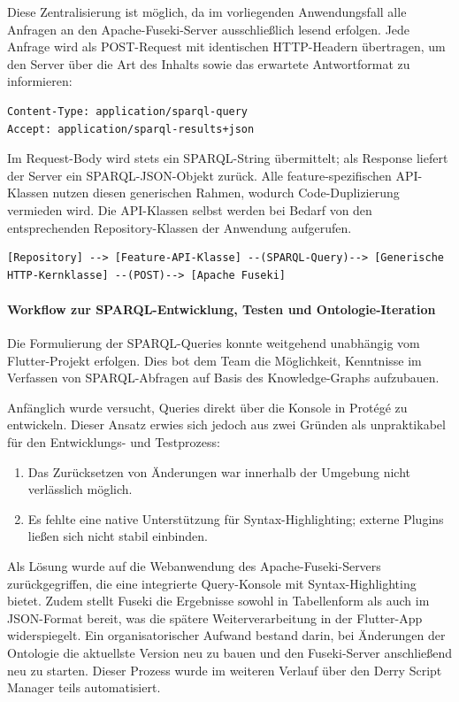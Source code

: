 Diese Zentralisierung ist möglich, da im vorliegenden Anwendungsfall alle Anfragen an den Apache-Fuseki-Server ausschließlich lesend erfolgen. Jede Anfrage wird als POST-Request mit identischen HTTP-Headern übertragen, um den Server über die Art des Inhalts sowie das erwartete Antwortformat zu informieren:

\begin{lstlisting}[caption={HTTP-Header der SPARQL-Anfragen}, label={lst:http_header}]
Content-Type: application/sparql-query
Accept: application/sparql-results+json
\end{lstlisting}

Im Request-Body wird stets ein SPARQL-String übermittelt; als Response liefert der Server ein SPARQL-JSON-Objekt zurück. Alle feature-spezifischen API-Klassen nutzen diesen generischen Rahmen, wodurch Code-Duplizierung vermieden wird. Die API-Klassen selbst werden bei Bedarf von den entsprechenden Repository-Klassen der Anwendung aufgerufen.

\begin{lstlisting}[caption={Aufrufkette einer SPARQL-Anfrage}, label={lst:aufrufkette}]
[Repository] --> [Feature-API-Klasse] --(SPARQL-Query)--> [Generische HTTP-Kernklasse] --(POST)--> [Apache Fuseki]
\end{lstlisting}

\paragraph{Workflow zur SPARQL-Entwicklung, Testen und Ontologie-Iteration}

Die Formulierung der SPARQL-Queries konnte weitgehend unabhängig vom Flutter-Projekt erfolgen. Dies bot dem Team die Möglichkeit, Kenntnisse im Verfassen von SPARQL-Abfragen auf Basis des Knowledge-Graphs aufzubauen.

Anfänglich wurde versucht, Queries direkt über die Konsole in Protégé zu entwickeln. Dieser Ansatz erwies sich jedoch aus zwei Gründen als unpraktikabel für den Entwicklungs- und Testprozess:
\begin{enumerate}
    \item Das Zurücksetzen von Änderungen war innerhalb der Umgebung nicht verlässlich möglich.
    \item Es fehlte eine native Unterstützung für Syntax-Highlighting; externe Plugins ließen sich nicht stabil einbinden.
\end{enumerate}

Als Lösung wurde auf die Webanwendung des Apache-Fuseki-Servers zurückgegriffen, die eine integrierte Query-Konsole mit Syntax-Highlighting bietet. Zudem stellt Fuseki die Ergebnisse sowohl in Tabellenform als auch im JSON-Format bereit, was die spätere Weiterverarbeitung in der Flutter-App widerspiegelt. Ein organisatorischer Aufwand bestand darin, bei Änderungen der Ontologie die aktuellste Version neu zu bauen und den Fuseki-Server anschließend neu zu starten. Dieser Prozess wurde im weiteren Verlauf über den Derry Script Manager teils automatisiert.

